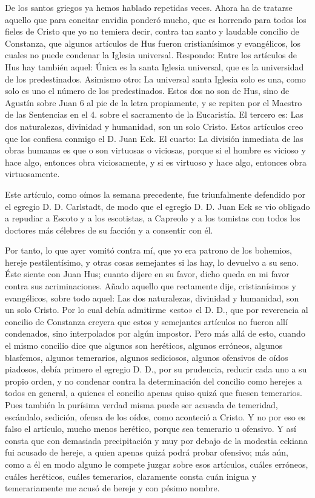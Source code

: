De los santos griegos ya hemos hablado repetidas veces. Ahora ha de tratarse aquello que para concitar envidia ponderó mucho, que es horrendo para todos los fieles de Cristo que yo no temiera decir, contra tan santo y laudable concilio de Constanza, que algunos artículos de Hus fueron cristianísimos y evangélicos, los cuales no puede condenar la Iglesia universal. Respondo: Entre los artículos de Hus hay también aquel: Única es la santa Iglesia universal, que es la universidad de los predestinados. Asimismo otro: La universal santa Iglesia solo es una, como solo es uno el número de los predestinados. Estos dos no son de Hus, sino de Agustín sobre Juan 6 al pie de la letra propiamente, y se repiten por el Maestro de las Sentencias en el 4. sobre el sacramento de la Eucaristía. El tercero es: Las dos naturalezas, divinidad y humanidad, son un solo Cristo. Estos artículos creo que los confiesa conmigo el D. \marginpar{\small[288]} Juan Eck. El cuarto: La división inmediata de las obras humanas es que o son virtuosas o viciosas, porque si el hombre es vicioso y hace algo, entonces obra viciosamente, y si es virtuoso y hace algo, entonces obra virtuosamente.

Este artículo, como oímos la semana precedente, fue triunfalmente defendido por el egregio D. D. Carlstadt, de modo que el egregio D. D. Juan Eck se vio obligado a repudiar a Escoto y a los escotistas, a Capreolo y a los tomistas con todos los doctores más célebres de su facción y a consentir con él.

Por tanto, lo que ayer vomitó contra mí, que yo era patrono de los bohemios, hereje pestilentísimo, y otras cosas semejantes si las hay, lo devuelvo a su seno. Éste siente con Juan Hus; cuanto dijere en su favor, dicho queda en mi favor contra sus acriminaciones. Añado aquello que rectamente dije, cristianísimos y evangélicos, sobre todo aquel: Las dos naturalezas, divinidad y humanidad, son un solo Cristo. Por lo cual debía admitirme «esto» el D. D., que por reverencia al concilio de Constanza creyera que estos y semejantes artículos no fueron allí condenados, sino interpolados por algún impostor. Pero más allá de esto, cuando el mismo concilio dice que algunos son heréticos, algunos erróneos, algunos blasfemos, algunos temerarios, algunos sediciosos, algunos ofensivos de oídos piadosos, debía primero el egregio D. D., por su prudencia, reducir cada uno a su propio orden, y no condenar contra la determinación del concilio como herejes a todos en general, a quienes el concilio apenas quiso quizá que fuesen temerarios. Pues también la purísima verdad misma puede ser acusada de temeridad, escándalo, sedición, ofensa de los oídos, como aconteció a Cristo. Y no por eso es falso el artículo, mucho menos herético, porque sea temerario u ofensivo. Y así consta que con demasiada precipitación y muy por debajo de la modestia eckiana fui acusado de hereje, a quien apenas quizá podrá probar ofensivo; más aún, como a él en modo alguno le compete juzgar sobre esos artículos, cuáles erróneos, cuáles heréticos, cuáles temerarios, claramente consta cuán inigua y temerariamente me acusó de hereje y con pésimo nombre.

